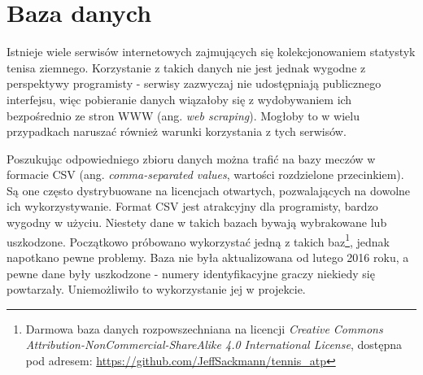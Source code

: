 \section{Baza danych}
\label{Sec:DataBase}
Istnieje wiele serwisów internetowych zajmujących się kolekcjonowaniem statystyk tenisa ziemnego. Korzystanie z takich danych nie jest jednak wygodne z perspektywy programisty - serwisy zazwyczaj nie udostępniają publicznego interfejsu, więc pobieranie danych wiązałoby się z wydobywaniem ich bezpośrednio ze stron WWW (ang. \textit{web scraping}). Mogłoby to w wielu przypadkach naruszać również warunki korzystania z tych serwisów.

Poszukując odpowiedniego zbioru danych można trafić na bazy meczów w formacie CSV (ang. \textit{comma-separated values}, wartości rozdzielone przecinkiem). Są one często dystrybuowane na licencjach otwartych, pozwalających na dowolne ich wykorzystywanie. Format CSV jest atrakcyjny dla programisty, bardzo wygodny w użyciu. Niestety dane w takich bazach bywają wybrakowane lub uszkodzone. Początkowo próbowano wykorzystać jedną z takich baz\footnote{Darmowa baza danych rozpowszechniana na licencji \textit{Creative Commons Attribution-NonCommercial-ShareAlike 4.0 International License}, dostępna pod adresem: \url{https://github.com/JeffSackmann/tennis_atp}}, jednak napotkano pewne problemy. Baza nie była aktualizowana od lutego 2016 roku, a pewne dane były uszkodzone - numery identyfikacyjne graczy niekiedy się powtarzały. Uniemożliwiło to wykorzystanie jej w projekcie.

